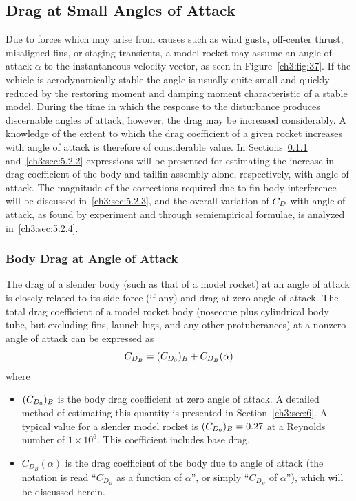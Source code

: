 \subsection{Drag at Small Angles of Attack}\label{ch3:sec:5.2}

Due to forces which may arise from causes such as wind gusts, off-center
thrust, misaligned fins, or staging transients, a model rocket may assume an
angle of attack $\alpha$ to the instantaneous velocity vector, as seen in
Figure~\ref{ch3:fig:37}. If the vehicle is aerodynamically stable the angle is
usually quite small and quickly reduced by the restoring moment and damping
moment characteristic of a stable model. During the time in which the response
to the disturbance produces discernable angles of attack, however, the drag may
be increased considerably. A knowledge of the extent to which the drag
coefficient of a given rocket increases with angle of attack is therefore of
considerable value. In Sections~\ref{ch3:sec:5.2.1} and~\ref{ch3:sec:5.2.2}
expressions will be presented for estimating the increase in drag coefficient
of the body and tailfin assembly alone, respectively, with angle of attack. The
magnitude of the corrections required due to fin-body interference will be
discussed in~\ref{ch3:sec:5.2.3}, and the overall variation of $C_{D}$ with angle
of attack, as found by experiment and through semiempirical formulae, is
analyzed in~\ref{ch3:sec:5.2.4}.

\subsubsection{Body Drag at Angle of Attack}\label{ch3:sec:5.2.1}

The drag of a slender body (such as that of a model rocket) at an angle of
attack is closely related to its side force (if any) and drag at zero angle of
attack. The total drag coefficient of a model rocket body (nosecone plus
cylindrical body tube, but excluding fins, launch lugs, and any other
protuberances) at a nonzero angle of attack can be expressed as
\begin{equation}\label{ch3:eq:136}
C_{D_B} = (C_{D_0})_B + C_{D_B}(\alpha)
\end{equation}
where
\begin{itemize}[leftmargin=2.5em,label={}]
  \item $(C_{D_0})_B$ is the body drag coefficient at zero angle of attack. A
  detailed method of estimating this quantity is presented in
  Section~\ref{ch3:sec:6}. A typical value for a slender model rocket is
  $(C_{D_0})_B = 0.27$ at a Reynolds number of $1 \times 10^{6}$. This coefficient
  includes base drag.
  \item $C_{D_B}(\alpha)$ is the drag coefficient of the body due to angle of
  attack (the notation is read ``$C_{D_B}$ as a function of $\alpha$'', or
  simply ``$C_{D_B}$ of $\alpha$''), which will be discussed herein.
\end{itemize}

